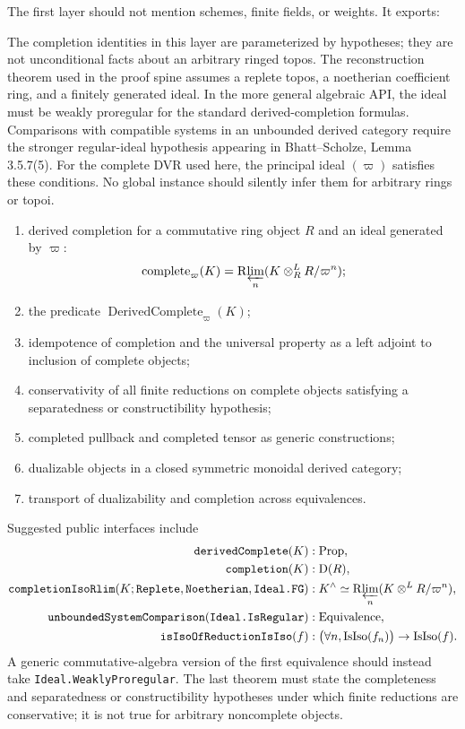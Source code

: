 The first layer should not mention schemes, finite fields, or weights.  It
exports:

The completion identities in this layer are parameterized by hypotheses;
they are not unconditional facts about an arbitrary ringed topos.  The
reconstruction theorem used in the proof spine assumes a replete topos, a
noetherian coefficient ring, and a finitely generated ideal.  In the more
general algebraic API, the ideal must be weakly proregular for the standard
derived-completion formulas.  Comparisons with compatible systems in an
unbounded derived category require the stronger regular-ideal hypothesis
appearing in Bhatt--Scholze, Lemma 3.5.7(5).  For the complete DVR used here,
the principal ideal \((\varpi)\) satisfies these conditions.  No global
instance should silently infer them for arbitrary rings or topoi.

\begin{enumerate}
\item derived completion for a commutative ring object \(R\) and an ideal
      generated by \(\varpi\):
      \[
       \operatorname{complete}_\varpi(K)
        =\mathrm R\!\varprojlim_n(K\otimes_R^LR/\varpi^n);
      \]
\item the predicate \(\operatorname{DerivedComplete}_\varpi(K)\);
\item idempotence of completion and the universal property as a left
      adjoint to inclusion of complete objects;
\item conservativity of all finite reductions on complete objects satisfying
      a separatedness or constructibility hypothesis;
\item completed pullback and completed tensor as generic constructions;
\item dualizable objects in a closed symmetric monoidal derived category;
\item transport of dualizability and completion across equivalences.
\end{enumerate}

\begin{formalization}
Suggested public interfaces include
{\small
\[
\begin{aligned}
\texttt{derivedComplete}(K)&:\operatorname{Prop},\\
\texttt{completion}(K)&:\mathrm D(R),\\
\texttt{completionIsoRlim}(K;
  \texttt{Replete},\texttt{Noetherian},\texttt{Ideal.FG})&:
 K^\wedge\simeq\mathrm R\!\varprojlim_n(K\otimes^LR/\varpi^n),\\
\texttt{unboundedSystemComparison}
  (\texttt{Ideal.IsRegular})&:\operatorname{Equivalence},\\
\texttt{isIsoOfReductionIsIso}(f)&:
 \bigl(\forall n,\operatorname{IsIso}(f_n)\bigr)
 \to\operatorname{IsIso}(f).
\end{aligned}
\]
}
A generic commutative-algebra version of the first equivalence should instead
take \texttt{Ideal.WeaklyProregular}.  The last theorem must state the
completeness and separatedness or constructibility hypotheses under which
finite reductions are conservative; it is not true for arbitrary
noncomplete objects.
\end{formalization}

